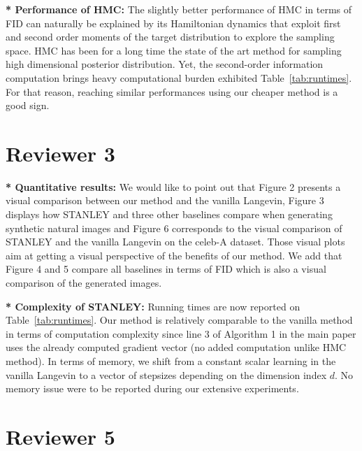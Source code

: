 \documentclass[letterpaper]{article} %
\begin{document}

\noindent \textbf{* Performance of HMC:}
The slightly better performance of HMC in terms of FID can naturally be explained by its Hamiltonian dynamics that exploit first and second order moments of the target distribution to explore the sampling space.
HMC has been for a long time the state of the art method for sampling high dimensional posterior distribution.
Yet, the second-order information computation brings heavy computational burden exhibited Table~\ref{tab:runtimes}.
For that reason, reaching similar performances using our cheaper method is a good sign.

\vspace{-0.1in}
\section{Reviewer 3}


\noindent \textbf{* Quantitative results:}
We would like to point out that Figure 2 presents a visual comparison between our method and the vanilla Langevin, Figure 3 displays how STANLEY and three other baselines compare when generating synthetic natural images and Figure 6 corresponds to the visual comparison of STANLEY and the vanilla Langevin on the celeb-A dataset. Those visual plots aim at getting a visual perspective of the benefits of our method.
We add that Figure 4 and 5 compare all baselines in terms of FID which is also a visual comparison of the generated images.

\noindent \textbf{* Complexity of STANLEY:}
Running times are now reported on Table~\ref{tab:runtimes}.
Our method is relatively comparable to the vanilla method in terms of computation complexity since line 3 of Algorithm 1 in the main paper uses the already computed gradient vector (no added computation unlike HMC method).
In terms of memory, we shift from a constant scalar learning in the vanilla Langevin to a vector of stepsizes depending on the dimension index $d$. No memory issue were to be reported during our extensive experiments.

\vspace{-0.1in}
\section{Reviewer 5}

\end{document}
